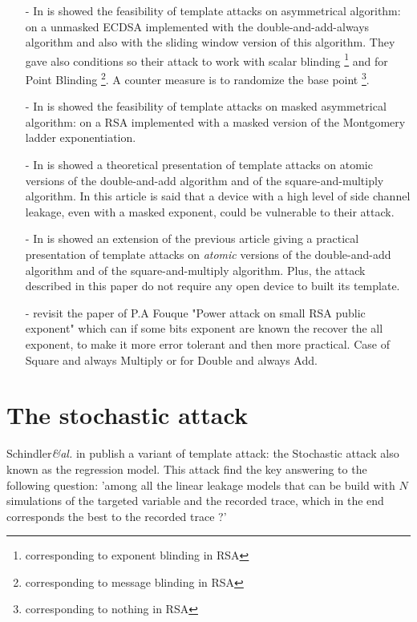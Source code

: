 \begin{itemize}  
	\item[-] In  is
	showed the feasibility of template attacks on asymmetrical algorithm:
	on a unmasked ECDSA implemented with the double-and-add-always algorithm
	and also with the sliding window version of this algorithm. They gave also conditions
	so their attack to work with scalar blinding \footnote{corresponding to exponent blinding in RSA}
	and for Point Blinding \footnote{corresponding to message blinding in RSA}.
	A counter measure is to randomize the base point \footnote{corresponding to nothing in RSA}.
	
	\item[-] In  is
	showed the feasibility of template attacks on masked asymmetrical algorithm:
	on a RSA implemented with a masked version of the Montgomery ladder exponentiation.
		
	
	\item[-] In  is
	showed a theoretical presentation of template attacks on atomic versions of 
	the double-and-add algorithm and of the square-and-multiply algorithm.
	In this article is said that a device with a high level of side channel 
	leakage, even with a masked exponent, could be vulnerable to their attack.
	
		
	\item[-] In  is
	showed an extension of the previous article giving a practical presentation 
	of template attacks	on \textit{atomic} versions of the double-and-add algorithm 
	and of the square-and-multiply algorithm.
	Plus, the attack described in this paper do not require any open device to built
	its template. 	
	
	\item[-] 
	revisit the paper of P.A Fouque "Power attack on small RSA public exponent" 
	which can if some bits exponent are known the recover the all exponent, 
	to make it more error tolerant and then more practical. Case of Square and always Multiply
	or for Double and always Add.
\end{itemize}

\section{The stochastic attack}
\label{The_stochastic_attack}
Schindler\textit{\&al.} in  
publish a variant of template attack: the Stochastic attack also known as the regression model.
This attack find the key answering to the following question:
'among all the linear leakage models that can be build with $N$ simulations of the targeted variable 
and the recorded trace, which in the end corresponds the best to the recorded trace ?'

